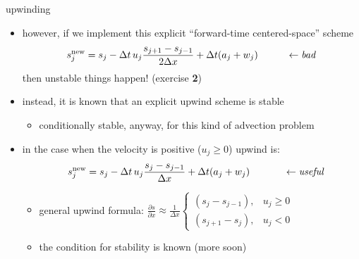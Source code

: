 \documentclass[10pt,dvipsnames]{beamer}
\newcommand{\snew}{s^{\text{new}}}
\begin{document}
\begin{frame}{upwinding}

\begin{itemize}
\item however, if we implement this explicit ``forward-time centered-space'' scheme
	$$\snew_j = s_j - \Delta t\, u_j \frac{s_{j+1}-s_{j-1}}{2\Delta x} + \Delta t (a_j + w_j) \hspace{1.0cm} \leftarrow \text{\emph{bad}}$$
then unstable things happen! (exercise \textbf{2})
\item instead, it is known that an explicit \alert{upwind} scheme is stable
    \begin{itemize}
    \item[$\circ$] \alert{conditionally} stable, anyway, for this kind of \alert{advection} problem
    \end{itemize}

\item in the case when the velocity is positive ($u_j \ge 0$) upwind is:
	$$\hspace{3mm} \snew_j = s_j - \Delta t\, u_j \frac{s_j-s_{j-1}}{\Delta x} + \Delta t (a_j + w_j) \hspace{1.2cm} \leftarrow \text{\emph{useful}}$$

    \begin{itemize}
    \item[$\circ$] general upwind formula: \quad $\displaystyle \frac{\partial s}{\partial x} \approx \frac{1}{\Delta x} \begin{cases} (s_j-s_{j-1}), & u_j \ge 0 \\ (s_{j+1}-s_j), & u_j < 0 \end{cases}$
    \item[$\circ$] the condition for stability is known (more soon)
    \end{itemize}
\end{itemize}
\end{frame}
\end{document}
